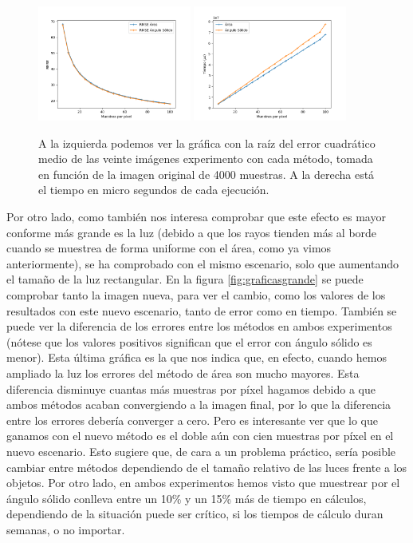 \documentclass{scrbook}
\begin{document}
\begin{figure}[ht]
	\centering
	\includegraphics[width=0.45\textwidth]{rmse_basicv2}
	\includegraphics[width=0.45\textwidth]{tiempo_basicv2}
	
	\caption{A la izquierda podemos ver la gráfica con la raíz del error cuadrático medio de las veinte imágenes experimento con cada método, tomada en función de la imagen original de 4000 muestras. A la derecha está el tiempo en micro segundos de cada ejecución.}
	\label{fig:graficasbasic}
\end{figure}

Por otro lado, como también nos interesa comprobar que este efecto es mayor conforme más grande es la luz (debido a que los rayos tienden más al borde cuando se muestrea de forma uniforme con el área, como ya vimos anteriormente), se ha comprobado con el mismo escenario, solo que aumentando el tamaño de la luz rectangular. En la figura \ref{fig:graficasgrande} se puede comprobar tanto la imagen nueva, para ver el cambio, como los valores de los resultados con este nuevo escenario, tanto de error como en tiempo. También se puede ver la diferencia de los errores entre los métodos en ambos experimentos (nótese que los valores positivos significan que el error con ángulo sólido es menor). Esta última gráfica es la que nos indica que, en efecto, cuando hemos ampliado la luz los errores del método de área son mucho mayores. Esta diferencia disminuye cuantas más muestras por píxel hagamos debido a que ambos métodos acaban convergiendo a la imagen final, por lo que la diferencia entre los errores debería converger a cero. Pero es interesante ver que lo que ganamos con el nuevo método es el doble aún con cien muestras por píxel en el nuevo escenario. Esto sugiere que, de cara a un problema práctico, sería posible cambiar entre métodos dependiendo de el tamaño relativo de las luces frente a los objetos. Por otro lado, en ambos experimentos hemos visto que muestrear por el ángulo sólido conlleva entre un 10\% y un 15\% más de tiempo en cálculos, dependiendo de la situación puede ser crítico, si los tiempos de cálculo duran semanas, o no importar.
\end{document}
